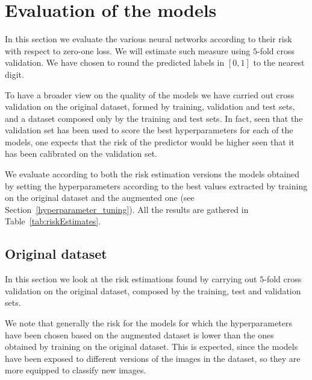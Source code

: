 \section{Evaluation of the models}\label{3_evaluation}
In this section we evaluate the various neural networks according to their risk with respect to zero-one loss. We will estimate such measure using $5$-fold cross validation. We have chosen to round the predicted labels in $\left[0,1\right]$ to the nearest digit.

To have a broader view on the quality of the models we have carried out cross validation on the original dataset, formed by training, validation and test sets, and a dataset composed only by the training and test sets. In fact, seen that the validation set has been used to score the best hyperparameters for each of the models, one expects that the risk of the predictor would be higher seen that it has been calibrated on the validation set. 

We evaluate according to both the risk estimation versions the models obtained by setting the hyperparameters according to the best values extracted by training on the original dataset and the augmented one (see Section~\ref{hyperparameter_tuning}). All the results are gathered in Table~\ref{tab:riskEstimates}.



\subsection{Original dataset}
In this section we look at the risk estimations found by carrying out $5$-fold cross validation on the original dataset, composed by the training, test and validation sets. 

We note that generally the risk for the models for which the hyperparameters have been chosen based on the augmented dataset is lower than the ones obtained by training on the original dataset. This is expected, since the models have been exposed to different versions of the images in the dataset, so they are more equipped to classify new images.

